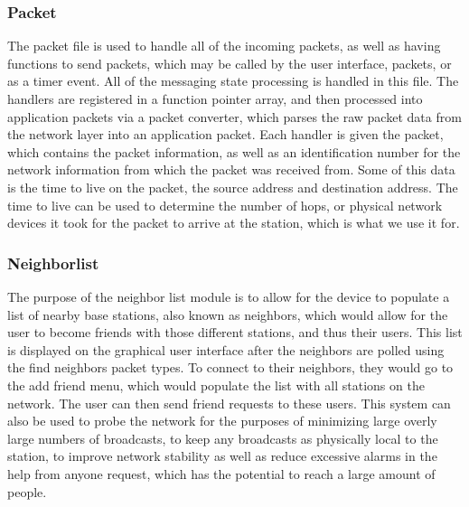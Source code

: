 \documentclass[journal,compsoc]{IEEEtran}
\begin{document}
\subsubsection{Packet} 
The packet file is used to handle all of the incoming packets, as well as having functions to send packets, which may be called by the user interface, packets, or as a timer event. All of the messaging state processing is handled in this file. The handlers are registered in a function pointer array, and then processed into application packets via a packet converter, which parses the raw packet data from the network layer into an application packet.\newline
Each handler is given the packet, which contains the packet information, as well as an identification number for the network information from which the packet was received from. Some of this data is the time to live on the packet, the source address and destination address. The time to live can be used to determine the number of hops, or physical network devices it took for the packet to arrive at the station, which is what we use it for.
\subsubsection{Neighborlist} 
The purpose of the neighbor list module is to allow for the device to populate a list of nearby base stations, also known as neighbors, which would allow for the user to become friends with those different stations, and thus their users. This list is displayed on the graphical user interface after the neighbors are polled using the find neighbors packet types. To connect to their neighbors, they would go to the add friend menu, which would populate the list with all stations on the network. The user can then send friend requests to these users. This system can also be used to probe the network for the purposes of minimizing large overly large numbers of broadcasts, to keep any broadcasts as physically local to the station, to improve network stability as well as reduce excessive alarms in the help from anyone request, which has the potential to reach a large amount of people.
\end{document}
